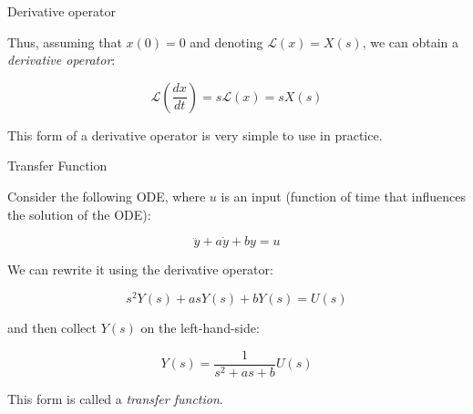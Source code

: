 \documentclass{beamer}
\begin{document}
\begin{frame}{Derivative operator}
\begin{flushleft}

Thus, assuming that $x(0) = 0$ and denoting $\mathcal{L}\left( x \right) = X(s)$, we can obtain a \emph{derivative operator}:

\begin{equation}
\label{eq:NoIC_laplace}
\mathcal{L}\left(\frac{dx}{dt}\right) = s \mathcal{L}\left(x\right) = s X(s)
\end{equation}

\bigskip

This form of a derivative operator is very simple to use in practice.

\end{flushleft}
\end{frame}



\begin{frame}{Transfer Function}
\begin{flushleft}

Consider the following ODE, where $u$ is an input (function of time that influences the solution of the ODE):

\begin{equation}
\ddot y + a \dot y + b y = u
\end{equation}

We can rewrite it using the derivative operator:

\begin{equation}
s^2 Y(s) + a s Y(s) + b Y(s) = U(s)
\end{equation}

and then collect $Y(s)$ on the left-hand-side:

\begin{equation}
Y(s) = \frac{1}{s^2 + a s + b} U(s)
\end{equation}

This form is called a \emph{transfer function}.

\end{flushleft}
\end{frame}
\end{document}
